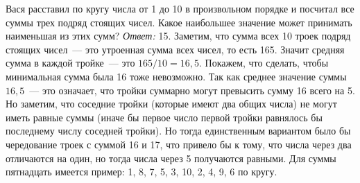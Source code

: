 \problem
Вася расставил по кругу числа от 1 до 10 в произвольном порядке и посчитал все
суммы трех подряд стоящих чисел.
Какое наибольшее значение может принимать наименьшая из этих сумм?
\solution
\emph{Ответ:} 15.
Заметим, что сумма всех 10 троек подряд стоящих чисел~--- это утроенная сумма
всех чисел, то есть 165.
Значит средняя сумма в каждой тройке~--- это $165 / 10 = 16{,}5$.
Покажем, что сделать, чтобы минимальная сумма была 16 тоже невозможно.
Так как среднее значение суммы $16{,}5$~--- это означает, что тройки суммарно
могут превысить сумму 16 всего на 5.
Но заметим, что соседние тройки (которые имеют два общих числа) не могут иметь
равные суммы (иначе бы первое число первой тройки равнялось бы последнему
числу соседней тройки).
Но тогда единственным вариантом было бы чередование троек с суммой 16 и 17,
что привело бы к тому, что числа через два отличаются на один, но тогда числа
через 5 получаются равными.
Для суммы пятнадцать имеется пример: 1, 8, 7, 5, 3, 10, 2, 4, 9, 6 по кругу.
\endproblem
